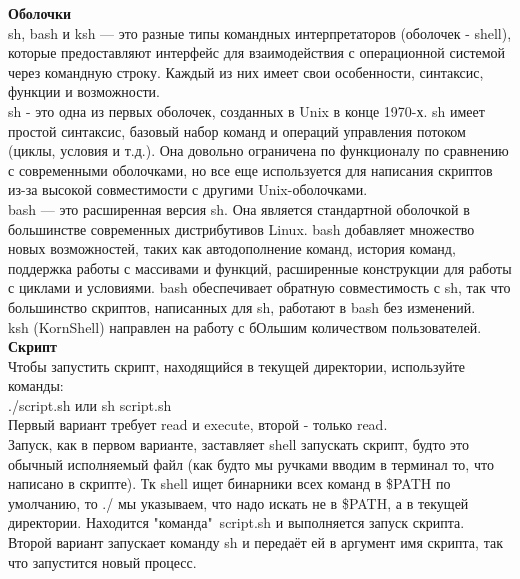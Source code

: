\noindent \textbf{Оболочки} \\
sh, bash и ksh — это разные типы командных интерпретаторов (оболочек - shell), которые предоставляют интерфейс для взаимодействия с операционной системой через командную строку. Каждый из них имеет свои особенности, синтаксис, функции и возможности. \\
sh - это одна из первых оболочек, созданных в Unix в конце 1970-х. sh имеет простой синтаксис, базовый набор команд и операций управления потоком (циклы, условия и т.д.). Она довольно ограничена по функционалу по сравнению с современными оболочками, но все еще используется для написания скриптов из-за высокой совместимости с другими Unix-оболочками. \\
bash — это расширенная версия sh. Она является стандартной оболочкой в большинстве современных дистрибутивов Linux. bash добавляет множество новых возможностей, таких как автодополнение команд, история команд, поддержка работы с массивами и функций, расширенные конструкции для работы с циклами и условиями. bash обеспечивает обратную совместимость с sh, так что большинство скриптов, написанных для sh, работают в bash без изменений. \\
ksh (KornShell) направлен на работу с бОльшим количеством пользователей. \\

\noindent \textbf{Скрипт} \\
Чтобы запустить скрипт, находящийся в текущей директории, используйте команды: \\
./script.sh или sh script.sh \\
Первый вариант требует read и execute, второй - только read. \\
Запуск, как в первом варианте, заставляет shell запускать скрипт, будто это обычный исполняемый файл (как будто мы ручками вводим в терминал то, что написано в скрипте). Тк shell ищет бинарники всех команд в \$PATH по умолчанию, то ./ мы указываем, что надо искать не в \$PATH, а в текущей директории. Находится "команда"\, script.sh и выполняется запуск скрипта.  \\
Второй вариант запускает команду sh и передаёт ей в аргумент имя скрипта, так что запустится новый процесс. \\

